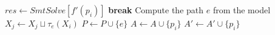 	\STATE $res \gets SmtSolve\left[
	 f'(p_i) 
	\right]$
		\STATE \textbf{break}
	\ENDIF
	\STATE Compute the path $e$ from the model
	\STATE $X_j \gets X_j \sqcup \tau_e(X_i)$
	\STATE $P \gets P \cup \{e\}$
	\STATE $A \gets A \cup \{p_i\}$
	\STATE $A' \gets A' \cup \{p_i\}$
\ENDWHILE
